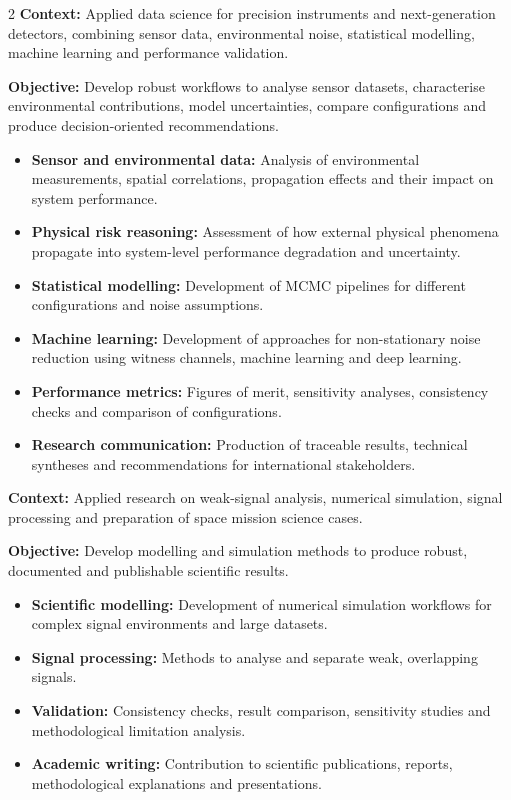 \documentclass[8pt,a4paper,ragged2e,withhyper]{altacv}
\begin{document}
\begin{paracol}{2}
\textbf{Context:} Applied data science for precision instruments and next-generation detectors, combining sensor data, environmental noise, statistical modelling, machine learning and performance validation.

\textbf{Objective:} Develop robust workflows to analyse sensor datasets, characterise environmental contributions, model uncertainties, compare configurations and produce decision-oriented recommendations.

\begin{itemize}
  \item \textbf{Sensor and environmental data:} Analysis of environmental measurements, spatial correlations, propagation effects and their impact on system performance.
  \item \textbf{Physical risk reasoning:} Assessment of how external physical phenomena propagate into system-level performance degradation and uncertainty.
  \item \textbf{Statistical modelling:} Development of MCMC pipelines for different configurations and noise assumptions.
  \item \textbf{Machine learning:} Development of approaches for non-stationary noise reduction using witness channels, machine learning and deep learning.
  \item \textbf{Performance metrics:} Figures of merit, sensitivity analyses, consistency checks and comparison of configurations.
  \item \textbf{Research communication:} Production of traceable results, technical syntheses and recommendations for international stakeholders.
\end{itemize}

\divider


\textbf{Context:} Applied research on weak-signal analysis, numerical simulation, signal processing and preparation of space mission science cases.

\textbf{Objective:} Develop modelling and simulation methods to produce robust, documented and publishable scientific results.

\begin{itemize}
  \item \textbf{Scientific modelling:} Development of numerical simulation workflows for complex signal environments and large datasets.
  \item \textbf{Signal processing:} Methods to analyse and separate weak, overlapping signals.
  \item \textbf{Validation:} Consistency checks, result comparison, sensitivity studies and methodological limitation analysis.
  \item \textbf{Academic writing:} Contribution to scientific publications, reports, methodological explanations and presentations.
\end{itemize}


\end{paracol}
\end{document}
